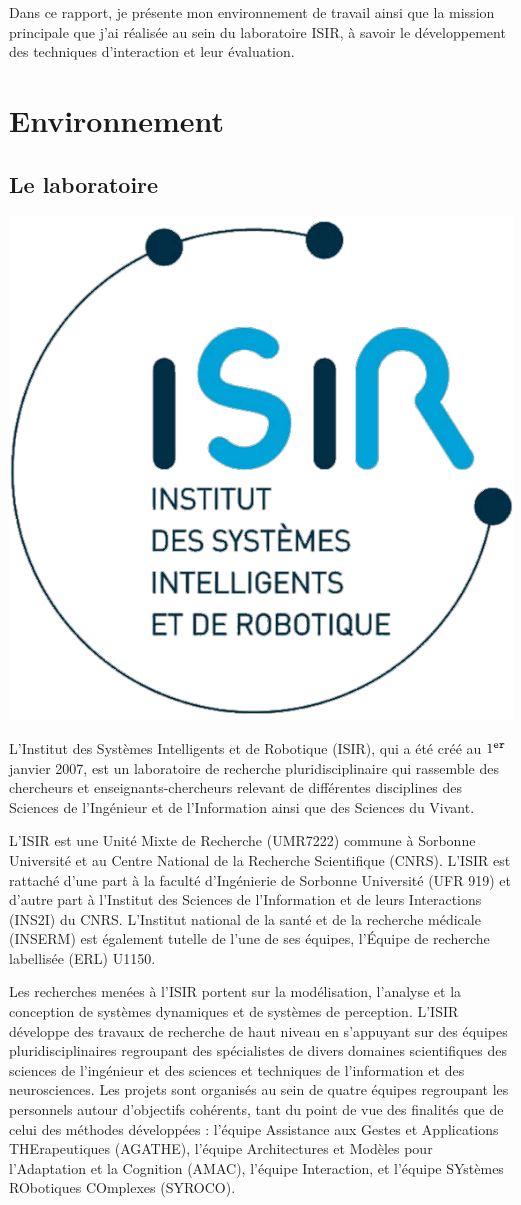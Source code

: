 \documentclass[12pt,a4paper]{article}
\begin{document}
Dans ce rapport, je présente mon environnement de travail ainsi que la mission principale que j'ai réalisée au sein du laboratoire ISIR, à savoir le développement des techniques d'interaction et leur évaluation.
\section{Environnement}
\subsection{Le laboratoire}
\begin{center}
	\includegraphics[width=.3\linewidth]{ISIR.png}
\end{center}

L'Institut des Systèmes Intelligents et de Robotique (ISIR), qui a été créé au $1^{\texttt{\footnotesize er}}$ janvier 2007, est un laboratoire de recherche pluridisciplinaire qui rassemble des chercheurs et enseignants-chercheurs relevant de différentes disciplines des Sciences de l’Ingénieur et de l’Information ainsi que des Sciences du Vivant.

L’ISIR est une Unité Mixte de Recherche (UMR7222) commune à Sorbonne Université et au Centre National de la Recherche Scientifique (CNRS). L'ISIR est rattaché d’une part à la faculté d’Ingénierie de Sorbonne Université (UFR 919) et d’autre part à l’Institut des Sciences de l'Information et de leurs Interactions (INS2I) du CNRS. L’Institut national de la santé et de la recherche médicale (INSERM) est également tutelle de l'une de ses équipes, l’Équipe de recherche labellisée (ERL) U1150.

Les recherches menées à l'ISIR portent sur la modélisation, l'analyse et la conception de systèmes dynamiques et de systèmes de perception. L'ISIR développe des travaux de recherche de haut niveau en s'appuyant sur des équipes pluridisciplinaires regroupant des spécialistes de divers domaines scientifiques des sciences de l'ingénieur et des sciences et techniques de l'information et des neurosciences. Les projets sont organisés au sein de quatre équipes regroupant les personnels autour d'objectifs cohérents, tant du point de vue des finalités que de celui des méthodes développées :  l'équipe Assistance aux Gestes et Applications THErapeutiques (AGATHE), l'équipe Architectures et Modèles pour l'Adaptation et la Cognition (AMAC), l'équipe Interaction, et l'équipe SYstèmes RObotiques COmplexes (SYROCO).
\end{document}
